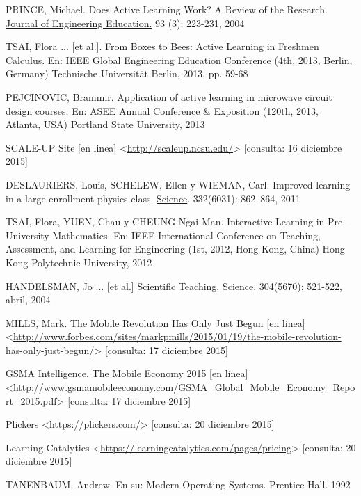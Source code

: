 

\begin{thebibliography}{9}

    PRINCE, Michael.
    Does Active Learning Work? A Review of the Research.
    \uline{Journal of Engineering Education.}
    93 (3): 223-231, 2004

    TSAI, Flora ... [et al.].
    From Boxes to Bees:
        Active Learning in Freshmen Calculus.
    En: IEEE Global Engineering Education Conference
    (4th, 2013, Berlin, Germany)
    Technische Universität Berlin,
    2013,
    pp. 59-68

    PEJCINOVIC, Branimir.
    Application of active learning in microwave circuit
        design courses.
    En: ASEE Annual Conference \& Exposition
    (120th, 2013, Atlanta, USA)
    Portland State University,
    2013

    SCALE-UP Site [en linea]
    <\url{http://scaleup.ncsu.edu/}>
    [consulta: 16 diciembre 2015]

    DESLAURIERS, Louis, SCHELEW, Ellen y WIEMAN, Carl.
    Improved learning in a large-enrollment physics class.
    \uline{Science}.
    332(6031): 862–864,
    2011

    TSAI, Flora, YUEN, Chau y CHEUNG Ngai-Man.
    Interactive Learning in Pre-University Mathematics.
    En: IEEE International Conference on Teaching,
        Assessment, and Learning for Engineering
    (1st, 2012, Hong Kong, China)
    Hong Kong Polytechnic University,
    2012

    HANDELSMAN, Jo ... [et al.]
    Scientific Teaching.
    \uline{Science}.
    304(5670): 521-522,
    abril, 2004

    MILLS, Mark.
    The Mobile Revolution Has Only Just Begun [en linea] \\
    <\url{http://www.forbes.com/sites/markpmills/2015/01/19/the-mobile-revolution-has-only-just-begun/}>
    [consulta: 17 diciembre 2015]

    GSMA Intelligence.
    The Mobile Economy 2015 [en linea] \\
    <\url{http://www.gsmamobileeconomy.com/GSMA_Global_Mobile_Economy_Report_2015.pdf}>
    [consulta: 17 diciembre 2015]

    Plickers
    <\url{https://plickers.com/}>
    [consulta: 20 diciembre 2015]

    Learning Catalytics
    <\url{https://learningcatalytics.com/pages/pricing}>
    [consulta: 20 diciembre 2015]

    TANENBAUM, Andrew.
    En su: Modern Operating Systems.
    Prentice-Hall.
    1992

\end{thebibliography}
